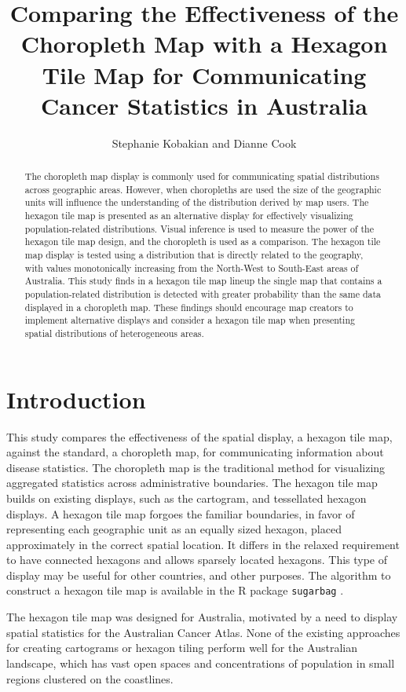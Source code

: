 \documentclass[times, doublespace]{anzsauth}
\title{Comparing the Effectiveness of the Choropleth Map with a Hexagon
Tile Map for Communicating Cancer Statistics in Australia}
\author{Stephanie Kobakian\addressnum{1} and Dianne Cook\addressnum{2}}
\affiliation{Queensland University of Technology and
Monash University}
\date{\vspace{-2.5em}}
\begin{document}
\maketitle
\begin{abstract}
The choropleth map display is commonly used for communicating spatial
distributions across geographic areas. However, when choropleths are
used the size of the geographic units will influence the understanding
of the distribution derived by map users. The hexagon tile map is
presented as an alternative display for effectively visualizing population-related
distributions. Visual inference is used to measure the power
of the hexagon tile map design, and the choropleth is used as a
comparison. The hexagon tile map display is tested using a distribution
that is directly related to the geography, with values monotonically
increasing from the North-West to South-East areas of Australia. This
study finds in a hexagon tile map lineup the single map that contains a
population-related distribution is detected with greater probability
than the same data displayed in a choropleth map. These findings should
encourage map creators to implement alternative displays and consider a
hexagon tile map when presenting spatial distributions of heterogeneous
areas.
\end{abstract}

\section{Introduction}\label{introduction}

This study compares the effectiveness of the spatial display, a hexagon
tile map, against the standard, a choropleth map, for communicating
information about disease statistics. The choropleth map is the
traditional method for visualizing aggregated statistics across
administrative boundaries. The hexagon tile map builds on existing
displays, such as the cartogram, and tessellated hexagon displays. A
hexagon tile map forgoes the familiar boundaries, in favor of
representing each geographic unit as an equally sized hexagon, placed
approximately in the correct spatial location. It differs in the relaxed
requirement to have connected hexagons and allows sparsely located
hexagons. This type of display may be useful for other countries, and
other purposes. The algorithm to construct a hexagon tile map is
available in the R package  \texttt{sugarbag} \citep{sugarbag}.

The hexagon tile map was designed for Australia, motivated by a need to
display spatial statistics for the Australian Cancer Atlas. None of the
existing approaches for creating cartograms or hexagon tiling perform
well for the Australian landscape, which has vast open spaces and
concentrations of population in small regions clustered on the
coastlines.
\end{document}
